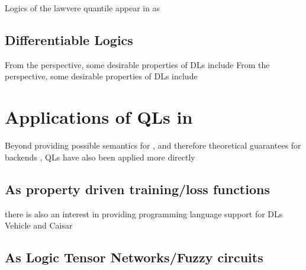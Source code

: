 Logics of the lawvere quantile appear in \AI{} as \yada

\subsection{Differentiable Logics}
\yada

From the \SiAI{} perspective, some desirable properties of DLs include \yada
From the \SuAI{} perspective, some desirable properties of DLs include \yada
\section{Applications of QLs in \InAI{}}
Beyond providing possible semantics for \InAI{}, and therefore theoretical guarantees for backends \yada, QLs have also been applied more directly \yada

\subsection{As property driven training/loss functions}
\yada there is also an interest in providing programming language support for DLs \yada Vehicle and Caisar \yada
\subsection{As Logic Tensor Networks/Fuzzy circuits}










\TODO
